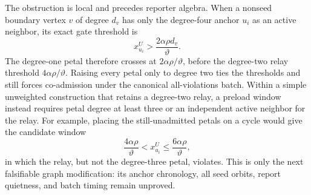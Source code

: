 \begin{remark}
\label{rem:active-relay-threshold-reversal}
The obstruction is local and precedes reporter algebra.  When a nonseed
boundary vertex $v$ of degree $d_v$ has only the degree-four anchor $u_i$ as
an active neighbor, its exact gate threshold is
\begin{equation}
 x^U_{u_i}>\frac{2\alpha\rho d_v}{\vartheta}.
 \label{eq:active-relay-general-child-threshold}
\end{equation}
The degree-one petal therefore crosses at $2\alpha\rho/\vartheta$, before the
degree-two relay threshold $4\alpha\rho/\vartheta$.  Raising every petal only
to degree two ties the thresholds and still forces co-admission under the
canonical all-violations batch.  Within a simple unweighted construction that retains a
degree-two relay, a preload window instead requires petal degree at least
three or an independent active neighbor for the relay.  For example,
placing the still-unadmitted petals on a cycle would give the candidate window
\begin{equation*}
 \frac{4\alpha\rho}{\vartheta}<x^U_{u_i}
 \leq\frac{6\alpha\rho}{\vartheta},
\end{equation*}
in which the relay, but not the degree-three petal, violates.  This is only
the next falsifiable graph modification: its anchor chronology, all seed
orbits, report quietness, and batch timing remain unproved.
\end{remark}

